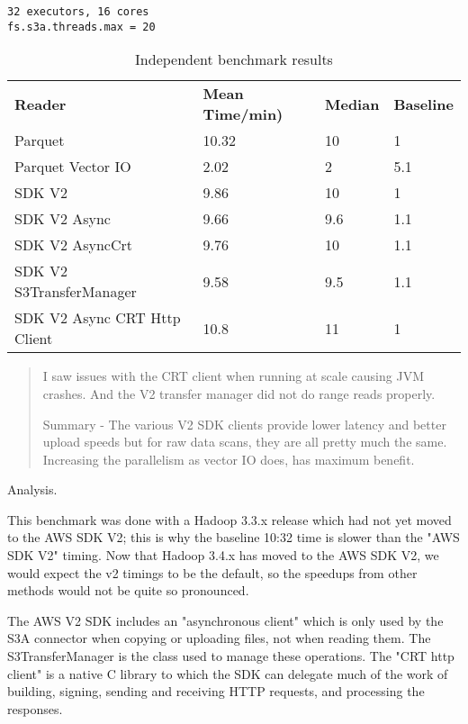 \documentclass[manuscript]{acmart}
\begin{document}
\begin{verbatim}
32 executors, 16 cores
fs.s3a.threads.max = 20
\end{verbatim}

\begin{table}
  \begin{tabular}{ l l l l }
    \hline
    \textbf{Reader} & \textbf{Mean Time/min)} & \textbf{Median} & \textbf{Baseline}\\
    Parquet	& 10.32	& 10 & 1 \\
    Parquet Vector IO	& 2.02 & 2	& 5.1 \\
    SDK V2 & 9.86 & 10 & 1 \\
    SDK V2 Async & 9.66	& 9.6 & 1.1 \\
    SDK V2 AsyncCrt	& 9.76 & 10 & 1.1 \\
    SDK V2 S3TransferManager & 9.58 & 9.5 & 1.1 \\
    SDK V2 Async CRT Http Client & 10.8 & 11 & 1 \\
    \hline
  \end{tabular}
\caption{Independent benchmark results}
\label{tab:independent-benchmark-results}
\end{table}

\begin{quotation}

I saw issues with the CRT client when running at scale causing JVM crashes.
And the V2 transfer manager did not do range reads properly.

Summary - The various V2 SDK clients provide lower latency and better upload speeds but for raw data scans,
they are all pretty much the same.
Increasing the parallelism as vector IO does, has maximum benefit.
\end{quotation}

Analysis.

This benchmark was done with a Hadoop 3.3.x release which had not yet moved to
the AWS SDK V2; this is why the baseline 10:32 time is slower than the "AWS SDK V2"
timing.
Now that Hadoop 3.4.x has moved to the AWS SDK V2, we would expect the v2 timings to
be the default, so the speedups from other methods would not be quite so pronounced.

The AWS V2 SDK includes an "asynchronous client" which is only used by the S3A
connector when copying or uploading files, not when reading them.
The S3TransferManager is the class used to manage these operations.
The "CRT http client" is a native C library to which the SDK can delegate much
of the work of building, signing, sending and receiving HTTP requests, and processing
the responses.
\end{document}
